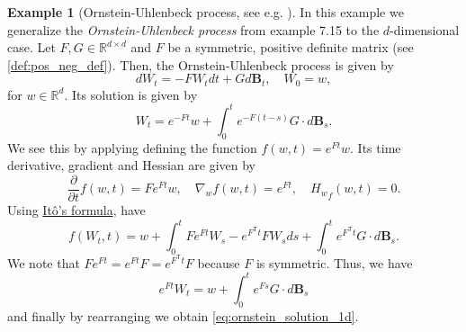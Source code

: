 \documentclass[12pt]{article}
\theoremstyle{definition}
\newtheorem{example}[example]{Example}
\numberwithin{equation}{section}
\newcommand{\R}{\mathbb{R}}
\newcommand{\T}{\mathsf{T}}
\begin{document}
\begin{example}[Ornstein-Uhlenbeck process, see e.g. ]
  \label{ex:ornstein_uhlenbeck}
  In this example we generalize the \emph{Ornstein-Uhlenbeck process} from example 7.15 \cite[pp.~152]{eAppliedStochasticAnalysis2021} to the $d$-dimensional case.
  Let $F, G \in \R^{d \times d}$ and $F$ be a symmetric, positive definite matrix (see \autoref{def:pos_neg_def}). Then, the Ornstein-Uhlenbeck process is given by
  \begin{equation*}
    dW_t = -F W_t dt + G d\mathbf{B}_t, \quad W_0 = w,
  \end{equation*}
  for $w \in \R^d$.
  Its solution is given by 
  \begin{equation}
    \label{eq:ornstein_solution_1d}
    W_t = e^{-F t}w + \int_0^t e^{-F (t - s)}G \cdot d\mathbf{B}_s.
  \end{equation}
  We see this by applying defining the function $f(w,t) = e^{F t}w$. Its time derivative, gradient and Hessian are given by
  \begin{equation*}
    \frac{\partial}{\partial t} f(w,t) = F e^{F t}w, \quad \nabla_w f(w,t) = e^{F t}, \quad {H_w}_f(w,t) = 0.
  \end{equation*}
  Using \hyperref[thm:ito_formula]{Itô's formula}, have 
  \begin{equation*}
      f(W_t, t) = w + \int_0^t F e^{F t}W_s - e^{F^\T t} FW_sds + \int_0^t e^{F^\T t} G \cdot d\mathbf{B}_s.
  \end{equation*}
  We note that $Fe^{Ft} = e^{Ft}F = e^{F^\T t}F$ because $F$ is symmetric.
  Thus, we have 
  \begin{equation*}
    e^{F t}W_t = w + \int_0^t e^{F s} G \cdot d\mathbf{B}_s
  \end{equation*}
  and finally by rearranging we obtain \eqref{eq:ornstein_solution_1d}.
\end{example}
\end{document}
